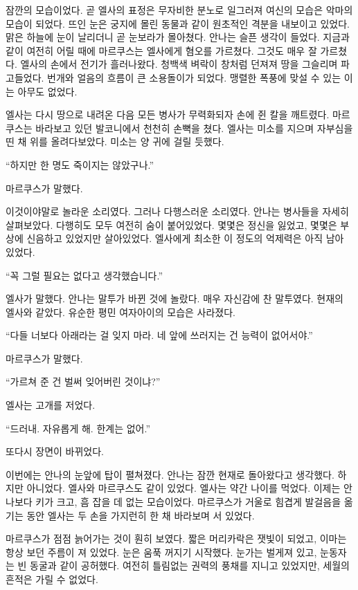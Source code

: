 잠깐의 모습이었다. 곧 엘사의 표정은 무자비한 분노로 일그러져 여신의 모습은 악마의 모습이 되었다. 뜨인 눈은 궁지에 몰린 동물과 같이 원초적인 격분을 내보이고 있었다. 맑은 하늘에 눈이 날리더니 곧 눈보라가 몰아쳤다. 안나는 슬픈 생각이 들었다. 지금과 같이 여전히 어릴 때에 마르쿠스는 엘사에게 혐오를 가르쳤다. 그것도 매우 잘 가르쳤다. 엘사의 손에서 전기가 흘러나왔다. 청백색 벼락이 창처럼 던져져 땅을 그슬리며 파고들었다. 번개와 얼음의 흐름이 큰 소용돌이가 되었다. 맹렬한 폭풍에 맞설 수 있는 이는 아무도 없었다.

엘사는 다시 땅으로 내려온 다음 모든 병사가 무력화되자 손에 쥔 칼을 깨트렸다. 마르쿠스는 바라보고 있던 발코니에서 천천히 손뼉을 쳤다. 엘사는 미소를 지으며 자부심을 띤 채 위를 올려다보았다. 미소는 양 귀에 걸릴 듯했다.

``하지만 한 명도 죽이지는 않았구나.''

마르쿠스가 말했다.

이것이야말로 놀라운 소리였다. 그러나 다행스러운 소리였다. 안나는 병사들을 자세히 살펴보았다. 다행히도 모두 여전히 숨이 붙어있었다. 몇몇은 정신을 잃었고, 몇몇은 부상에 신음하고 있었지만 살아있었다. 엘사에게 최소한 이 정도의 억제력은 아직 남아 있었다.

``꼭 그럴 필요는 없다고 생각했습니다.''

엘사가 말했다. 안나는 말투가 바뀐 것에 놀랐다. 매우 자신감에 찬 말투였다. 현재의 엘사와 같았다. 유순한 평민 여자아이의 모습은 사라졌다.

``다들 너보다 아래라는 걸 잊지 마라. 네 앞에 쓰러지는 건 능력이 없어서야.''

마르쿠스가 말했다.

``가르쳐 준 건 벌써 잊어버린 것이냐?''

엘사는 고개를 저었다.

``드러내. 자유롭게 해. 한계는 없어.''

또다시 장면이 바뀌었다.

이번에는 안나의 눈앞에 탑이 펼쳐졌다. 안나는 잠깐 현재로 돌아왔다고 생각했다. 하지만 아니었다. 엘사와 마르쿠스도 같이 있었다. 엘사는 약간 나이를 먹었다. 이제는 안나보다 키가 크고, 흠 잡을 데 없는 모습이었다. 마르쿠스가 거울로 힘겹게 발걸음을 옮기는 동안 엘사는 두 손을 가지런히 한 채 바라보며 서 있었다.

마르쿠스가 점점 늙어가는 것이 훤히 보였다. 짧은 머리카락은 잿빛이 되었고, 이마는 항상 보던 주름이 져 있었다. 눈은 움푹 꺼지기 시작했다. 눈가는 벌게져 있고, 눈동자는 빈 동굴과 같이 공허했다. 여전히 틀림없는 권력의 풍채를 지니고 있었지만, 세월의 흔적은 가릴 수 없었다.

